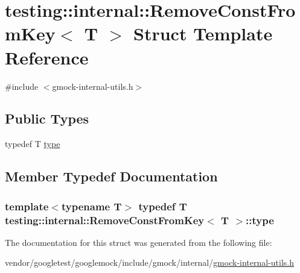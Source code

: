 \hypertarget{structtesting_1_1internal_1_1RemoveConstFromKey}{}\section{testing\+:\+:internal\+:\+:Remove\+Const\+From\+Key$<$ T $>$ Struct Template Reference}
\label{structtesting_1_1internal_1_1RemoveConstFromKey}


{\ttfamily \#include $<$gmock-\/internal-\/utils.\+h$>$}

\subsection*{Public Types}
\begin{DoxyCompactItemize}
\item 
typedef T \hyperlink{structtesting_1_1internal_1_1RemoveConstFromKey_ab657b0a0fe4ebc499d27011f73c794c1}{type}
\end{DoxyCompactItemize}


\subsection{Member Typedef Documentation}
\subsubsection[{\texorpdfstring{type}{type}}]{\setlength{\rightskip}{0pt plus 5cm}template$<$typename T$>$ typedef T {\bf testing\+::internal\+::\+Remove\+Const\+From\+Key}$<$ T $>$\+::{\bf type}}\hypertarget{structtesting_1_1internal_1_1RemoveConstFromKey_ab657b0a0fe4ebc499d27011f73c794c1}{}\label{structtesting_1_1internal_1_1RemoveConstFromKey_ab657b0a0fe4ebc499d27011f73c794c1}


The documentation for this struct was generated from the following file\+:\begin{DoxyCompactItemize}
\item 
vendor/googletest/googlemock/include/gmock/internal/\hyperlink{gmock-internal-utils_8h}{gmock-\/internal-\/utils.\+h}\end{DoxyCompactItemize}
